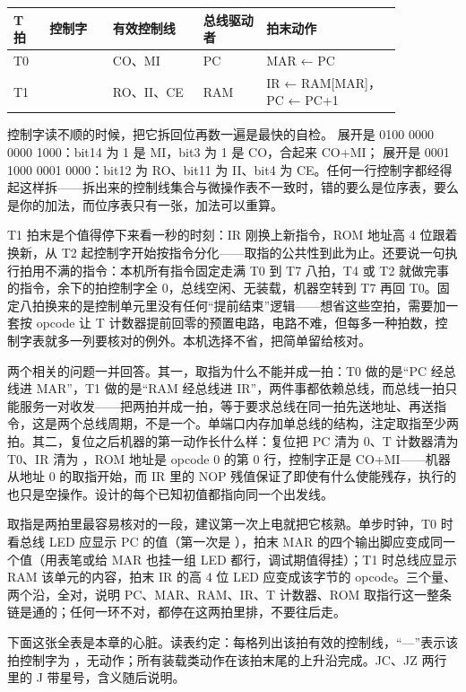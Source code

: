 \begin{longtable}{L{0.08\linewidth}L{0.14\linewidth}L{0.20\linewidth}L{0.14\linewidth}L{0.30\linewidth}}
\toprule
T 拍 & 控制字 & 有效控制线 & 总线驱动者 & 拍末动作 \\
\midrule
T0 &  & CO、MI & PC & MAR ← PC \\\tablerowrule
T1 &  & RO、II、CE & RAM & IR ← RAM[MAR]，PC ← PC+1 \\
\bottomrule
\end{longtable}

控制字读不顺的时候，把它拆回位再数一遍是最快的自检。 展开是 0100 0000 0000 1000：bit14 为 1 是 MI，bit3 为 1 是 CO，合起来 CO+MI； 展开是 0001 1000 0001 0000：bit12 为 RO、bit11 为 II、bit4 为 CE。任何一行控制字都经得起这样拆——拆出来的控制线集合与微操作表不一致时，错的要么是位序表，要么是你的加法，而位序表只有一张，加法可以重算。

T1 拍末是个值得停下来看一秒的时刻：IR 刚换上新指令，ROM 地址高 4 位跟着换新，从 T2 起控制字开始按指令分化——取指的公共性到此为止。还要说一句执行拍用不满的指令：本机所有指令固定走满 T0 到 T7 八拍，T4 或 T2 就做完事的指令，余下的拍控制字全 0，总线空闲、无装载，机器空转到 T7 再回 T0。固定八拍换来的是控制单元里没有任何“提前结束”逻辑——想省这些空拍，需要加一套按 opcode 让 T 计数器提前回零的预置电路，电路不难，但每多一种拍数，控制字表就多一列要核对的例外。本机选择不省，把简单留给核对。

两个相关的问题一并回答。其一，取指为什么不能并成一拍：T0 做的是“PC 经总线进 MAR”，T1 做的是“RAM 经总线进 IR”，两件事都依赖总线，而总线一拍只能服务一对收发——把两拍并成一拍，等于要求总线在同一拍先送地址、再送指令，这是两个总线周期，不是一个。单端口内存加单总线的结构，注定取指至少两拍。其二，复位之后机器的第一动作长什么样：复位把 PC 清为 0、T 计数器清为 T0、IR 清为 ，ROM 地址是 opcode 0 的第 0 行，控制字正是 CO+MI——机器从地址 0 的取指开始，而 IR 里的 NOP 残值保证了即使有什么使能残存，执行的也只是空操作。设计的每个已知初值都指向同一个出发线。

取指是两拍里最容易核对的一段，建议第一次上电就把它核熟。单步时钟，T0 时看总线 LED 应显示 PC 的值（第一次是 ），拍末 MAR 的四个输出脚应变成同一个值（用表笔或给 MAR 也挂一组 LED 都行，调试期值得挂）；T1 时总线应显示 RAM 该单元的内容，拍末 IR 的高 4 位 LED 应变成该字节的 opcode。三个量、两个沿，全对，说明 PC、MAR、RAM、IR、T 计数器、ROM 取指行这一整条链是通的；任何一环不对，都停在这两拍里排，不要往后走。

下面这张全表是本章的心脏。读表约定：每格列出该拍有效的控制线，“—”表示该拍控制字为 ，无动作；所有装载类动作在该拍末尾的上升沿完成。JC、JZ 两行里的 J 带星号，含义随后说明。

